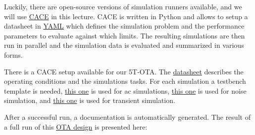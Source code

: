 \documentclass[
  a4paper,
  DIV=11,
  numbers=noendperiod]{scrartcl}
\begin{document}
Luckily, there are open-source versions of simulation runners available,
and we will use \href{https://github.com/efabless/cace}{CACE} in this
lecture. CACE is written in Python and allows to setup a datasheet in
\href{https://yaml.org}{YAML} which defines the simulation problem and
the performance parameters to evaluate against which limits. The
resulting simulations are then run in parallel and the simulation data
is evaluated and summarized in various forms.

There is a CACE setup available for our 5T-OTA. The
\href{./cace/voltage-buffer-ota.yaml}{datasheet} describes the operating
conditions and the simulations tasks. For each simulation a testbench
template is needed, \href{./cace/templates/ota-5t-ac.sch}{this one} is
used for ac simulations, \href{./cace/templates/ota-5t-noise.sch}{this
one} is used for noise simulation, and
\href{./cace/templates/ota-5t-tran.sch}{this one} is used for transient
simulation.

After a successful run, a documentation is automatically generated. The
result of a full run of this \href{./xschem/ota-5t.svg}{OTA design} is
presented here:
\end{document}
